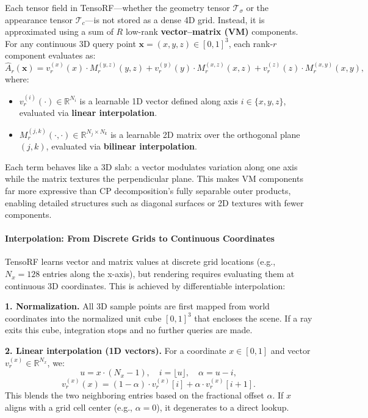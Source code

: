 \begin{enrichment}
\begin{enrichment}
    Each tensor field in TensoRF—whether the geometry tensor \( \mathcal{T}_\sigma \) or the appearance tensor \( \mathcal{T}_c \)—is not stored as a dense 4D grid. Instead, it is approximated using a sum of \( R \) low-rank \textbf{vector--matrix (VM)} components. For any continuous 3D query point \( \mathbf{x} = (x, y, z) \in [0,1]^3 \), each rank-\( r \) component evaluates as:
    \[
    \hat{A}_r(\mathbf{x}) =
    v^{(x)}_r(x) \cdot M^{(y,z)}_r(y,z) +
    v^{(y)}_r(y) \cdot M^{(x,z)}_r(x,z) +
    v^{(z)}_r(z) \cdot M^{(x,y)}_r(x,y),
    \]
    where:
    \begin{itemize}
        \item \( v^{(i)}_r(\cdot) \in \mathbb{R}^{N_i} \) is a learnable 1D vector defined along axis \( i \in \{x, y, z\} \), evaluated via \textbf{linear interpolation}.
        \item \( M^{(j,k)}_r(\cdot, \cdot) \in \mathbb{R}^{N_j \times N_k} \) is a learnable 2D matrix over the orthogonal plane \( (j,k) \), evaluated via \textbf{bilinear interpolation}.
    \end{itemize}
    
    Each term behaves like a 3D slab: a vector modulates variation along one axis while the matrix textures the perpendicular plane. This makes VM components far more expressive than CP decomposition’s fully separable outer products, enabling detailed structures such as diagonal surfaces or 2D textures with fewer components.
    
    \paragraph{Interpolation: From Discrete Grids to Continuous Coordinates}
    \label{par:chapter23_tensorf_interpolation}
    
    TensoRF learns vector and matrix values at discrete grid locations (e.g., \( N_x = 128 \) entries along the x-axis), but rendering requires evaluating them at continuous 3D coordinates. This is achieved by differentiable interpolation:
    
    \smallskip
    \textbf{1. Normalization.} All 3D sample points are first mapped from world coordinates into the normalized unit cube \( [0,1]^3 \) that encloses the scene. If a ray exits this cube, integration stops and no further queries are made.
    
    \smallskip
    \textbf{2. Linear interpolation (1D vectors).} For a coordinate \( x \in [0,1] \) and vector \( v^{(x)}_r \in \mathbb{R}^{N_x} \), we:
    \[
    u = x \cdot (N_x - 1), \quad i = \lfloor u \rfloor, \quad \alpha = u - i,
    \]
    \[
    v^{(x)}_r(x) = (1 - \alpha) \cdot v^{(x)}_r[i] + \alpha \cdot v^{(x)}_r[i+1].
    \]
    This blends the two neighboring entries based on the fractional offset \( \alpha \). If \( x \) aligns with a grid cell center (e.g., \( \alpha = 0 \)), it degenerates to a direct lookup.
    

\end{enrichment}
\end{enrichment}
